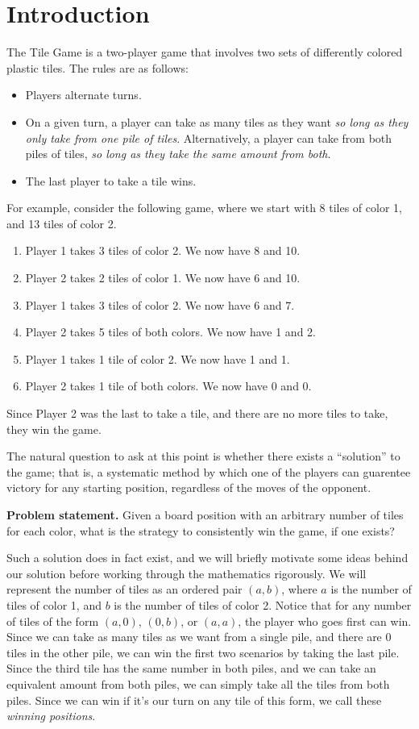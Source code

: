\documentclass[11pt, letterpaper]{article}
\begin{document}
\section{Introduction}\label{sec:1}
The Tile Game is a two-player game that involves two sets of differently colored plastic tiles. The rules are as follows:
\begin{itemize}
	\item Players alternate turns.
	\item On a given turn, a player can take as many tiles as they want \emph{so long as they only take from one pile of tiles}. Alternatively, a player can take from both piles of tiles, \emph{so long as they take the same amount from both}.
	\item The last player to take a tile wins.
\end{itemize}
For example, consider the following game, where we start with 8 tiles of color 1, and 13 tiles of color 2.
\begin{enumerate}
	\item Player 1 takes 3 tiles of color 2. We now have 8 and 10.
	\item Player 2 takes 2 tiles of color 1. We now have 6 and 10.
	\item Player 1 takes 3 tiles of color 2. We now have 6 and 7.
	\item Player 2 takes 5 tiles of both colors. We now have 1 and 2.
	\item Player 1 takes 1 tile of color 2. We now have 1 and 1.
	\item Player 2 takes 1 tile of both colors. We now have 0 and 0.
\end{enumerate}
Since Player 2 was the last to take a tile, and there are no more tiles to take, they win the game.

The natural question to ask at this point is whether there exists a ``solution'' to the game; that is, a systematic method by which one of the players can guarentee victory for any starting position, regardless of the moves of the opponent.
\begin{mdframed}[linewidth=1pt]
	\textbf{Problem statement.} Given a board position with an arbitrary number of tiles for each color, what is the strategy to consistently win the game, if one exists?
\end{mdframed}

Such a solution does in fact exist, and we will briefly motivate some ideas behind our solution before working through the mathematics rigorously. We will represent the number of tiles as an ordered pair $(a,b)$, where $a$ is the number of tiles of color 1, and $b$ is the number of tiles of color 2. Notice that for any number of tiles of the form $(a,0)$, $(0,b)$, or $(a,a)$, the player who goes first can win. Since we can take as many tiles as we want from a single pile, and there are 0 tiles in the other pile, we can win the first two scenarios by taking the last pile. Since the third tile has the same number in both piles, and we can take an equivalent amount from both piles, we can simply take all the tiles from both piles. Since we can win if it's our turn on any tile of this form, we call these \emph{winning positions}.
\end{document}
